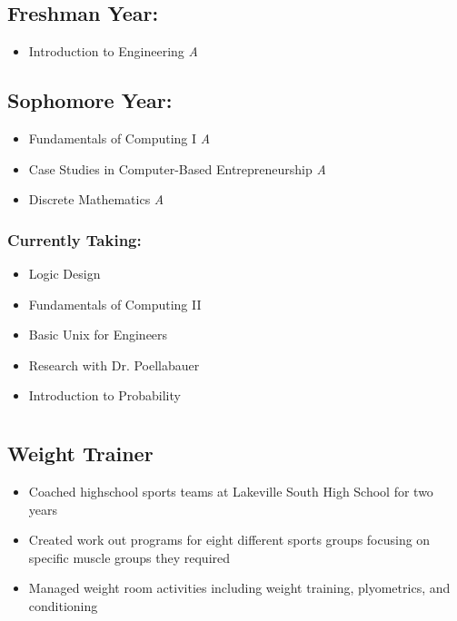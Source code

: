 \documentclass[10pt]{article}
\begin{document}
\begin{minipage}[t]{0.35\textwidth}
		\subsection*{Freshman Year:}
		\begin{itemize}[noitemsep,nolistsep,leftmargin=*]
			\item {Introduction to Engineering \hfill \emph{A}}
		\end{itemize}
		\subsection*{Sophomore Year:}
		\begin{itemize}[noitemsep,nolistsep,leftmargin=*]
			\item Fundamentals of Computing I \hfill \emph{A} 
			\item Case Studies in Computer-Based Entrepreneurship \hfill \emph{A}
			\item Discrete Mathematics \hfill \emph{A}
		\end{itemize}
			\subsubsection*{Currently Taking:}
			\begin{itemize}[noitemsep,nolistsep,leftmargin=*]
				\item Logic Design
				\item Fundamentals of Computing II
				\item Basic Unix for Engineers
				\item Research with Dr. Poellabauer
				\item Introduction to Probability
			\end{itemize}

	\section*{}
		\subsection*{Weight Trainer}
		\begin{itemize}[noitemsep,nolistsep,leftmargin=*]
			\item Coached highschool sports teams at Lakeville South High School for two years
			\item Created work out programs for eight different sports groups focusing on specific muscle groups they required
			\item Managed weight room activities including weight training, plyometrics, and conditioning
		\end{itemize}


\end{minipage}
\end{document}
